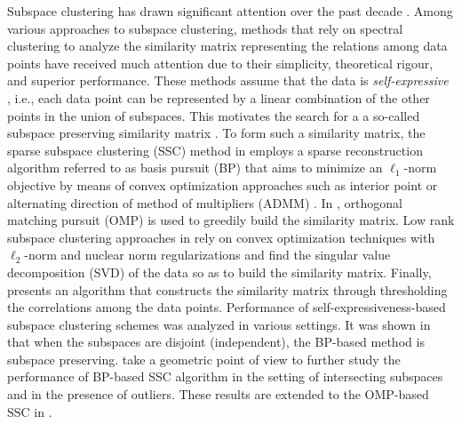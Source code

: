 Subspace clustering has drawn significant attention over the past decade \cite{vidal2011subspace}. Among various approaches to subspace clustering, methods that rely on spectral clustering \cite{ng2001spectral} to analyze the similarity matrix representing the relations among data points have received much attention due to their simplicity, theoretical rigour, and superior performance. These methods assume that the data is {\em self-expressive} \cite{elhamifar2009sparse}, i.e., each data point can be represented by a linear combination of the other points in the union of subspaces. This motivates the search for a a so-called subspace preserving similarity matrix {\color{black}{which establishes stronger connections among the points originating from a similar subspace}}. To form such a similarity matrix, the sparse subspace clustering (SSC) method in \cite{elhamifar2009sparse,elhamifar2013sparse} employs a sparse reconstruction algorithm referred to as basis pursuit (BP) that aims to minimize an $\ell_1$-norm objective by means of convex optimization approaches such as interior point \cite{kim2007interior} or alternating direction of method of multipliers (ADMM) \cite{boyd2011distributed}. In \cite{dyer2013greedy,you2015sparse}, orthogonal matching pursuit (OMP) is used to greedily build the similarity matrix. Low rank subspace clustering approaches in \cite{lu2012robust,liu2013robust,favaro2011closed,vidal2014low} rely on convex optimization techniques with $\ell_2$-norm and nuclear norm regularizations and find the singular value decomposition (SVD) of the data so as to build the similarity matrix. Finally, \cite{heckel2015robust} presents an algorithm that constructs the similarity matrix through thresholding the correlations among the data points. Performance of self-expressiveness-based subspace clustering schemes was analyzed in various settings. It was shown in \cite{elhamifar2009sparse,elhamifar2013sparse} that when the subspaces are disjoint (independent), the BP-based method is subspace preserving. \cite{soltanolkotabi2012geometric,soltanolkotabi2014robust} take a geometric point of view to further study the performance of BP-based SSC algorithm in the setting of intersecting subspaces and in the presence of outliers. These results are extended to the OMP-based SSC in \cite{dyer2013greedy,you2015sparse}.  

